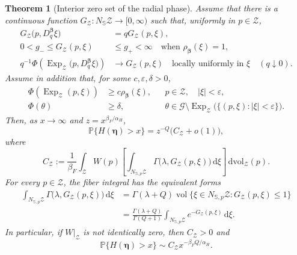 \documentclass[11pt]{amsart}
\numberwithin{equation}{section}
\newtheorem{theorem}{Theorem}[section]
\theoremstyle{definition}
\theoremstyle{remark}
\newcommand{\dd}{\,\mathrm{d}}
\newcommand{\dvol}{\,\mathrm{dvol}}
\newcommand{\vol}{\operatorname{vol}}
\newcommand{\eps}{\varepsilon}
\begin{document}
\begin{theorem}[Interior zero set of the radial phase]
Assume that there is a continuous function
$G_{\mathcal Z}:N_{\mathbb S}\mathcal Z\to[0,\infty)$ such that, uniformly in
$p\in\mathcal Z$,
\begin{align}
 G_{\mathcal Z}\bigl(p,D_q^{\bm\beta}\xi\bigr)
 &=qG_{\mathcal Z}(p,\xi),
 \label{eq:weibull-interior-model-homogeneity}\\
 0<g_-\le G_{\mathcal Z}(p,\xi)&\le g_+<\infty
 \quad\text{when }\rho_{\bm\beta}(\xi)=1,
 \label{eq:weibull-interior-model-coercivity}\\
 q^{-1}\Phi\!\left(\operatorname{Exp}_{\mathcal Z}\bigl(p,D_q^{\bm\beta}\xi\bigr)\right)
 &\longrightarrow G_{\mathcal Z}(p,\xi)
 \quad\text{locally uniformly in }\xi
 \quad(q\downarrow0).
 \label{eq:weibull-interior-model-convergence}
\end{align}
Assume in addition that, for some $c,\eps,\delta>0$,
\begin{align}
 \Phi(\operatorname{Exp}_{\mathcal Z}(p,\xi))&\ge c\rho_{\bm\beta}(\xi),
 &&p\in\mathcal Z,
 \quad |\xi|<\eps,
 \label{eq:weibull-interior-lower-bound}\\
 \Phi(\theta)&\ge\delta,
 &&\theta\in\mathcal G\setminus
 \operatorname{Exp}_{\mathcal Z}\bigl(\{(p,\xi):|\xi|<\eps\}\bigr).
 \label{eq:weibull-interior-gap}
\end{align}
Then, as $x\to\infty$ and $z=x^{\beta_F/\alpha_H}$,
\begin{equation}\label{eq:weibull-interior-asymptotic}
 \mathbb P\{H(\bm\eta)>x\}
 =z^{-Q}\bigl(C_{\mathcal Z}+o(1)\bigr),
\end{equation}
where
\begin{equation}\label{eq:weibull-interior-constant}
 C_{\mathcal Z}
 :=\frac{1}{\beta_F}\int_{\mathcal Z}W(p)
 \left[
   \int_{N_{\mathbb S,p}\mathcal Z}
   \Gamma\bigl(\lambda,G_{\mathcal Z}(p,\xi)\bigr)\dd\xi
 \right]\dvol_{\mathcal Z}(p).
\end{equation}
For every $p\in\mathcal Z$, the fiber integral has the equivalent forms
\begin{align}
 \int_{N_{\mathbb S,p}\mathcal Z}
 \Gamma\bigl(\lambda,G_{\mathcal Z}(p,\xi)\bigr)\dd\xi
 &=\Gamma(\lambda+Q)
   \vol\bigl\{\xi\in N_{\mathbb S,p}\mathcal Z:
   G_{\mathcal Z}(p,\xi)\le1\bigr\}
 \label{eq:weibull-interior-sublevel-form}\\
 &=\frac{\Gamma(\lambda+Q)}{\Gamma(Q+1)}
   \int_{N_{\mathbb S,p}\mathcal Z}e^{-G_{\mathcal Z}(p,\xi)}\dd\xi.
 \label{eq:weibull-interior-exponential-form}
\end{align}
In particular, if $W|_{\mathcal Z}$ is not identically zero, then
$C_{\mathcal Z}>0$ and
\begin{equation}\label{eq:weibull-interior-x-form}
 \mathbb P\{H(\bm\eta)>x\}
 \sim C_{\mathcal Z}x^{-\beta_F Q/\alpha_H}.
\end{equation}
\end{theorem}
\end{document}
